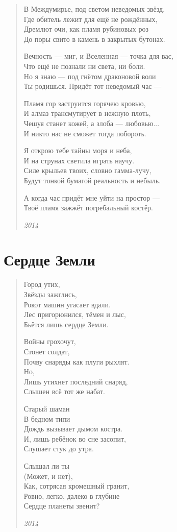 \begin{verse}
В Междумирье, под светом неведомых звёзд,\\
Где обитель лежит для ещё не рождённых,\\
Дремлют очи, как пламя рубиновых роз\\
До поры свито в камень в закрытых бутонах.

Вечность --- миг, и Вселенная --- точка для вас,\\
Что ещё не познали ни света, ни боли.\\
Но я знаю --- под гнётом драконовой воли\\
Ты родишься. Придёт тот неведомый час ---

Пламя гор заструится горячею кровью,\\
И алмаз трансмутирует в нежную плоть,\\
Чешуя станет кожей, а злоба --- любовью...\\
И никто нас не сможет тогда побороть.

Я открою тебе тайны моря и неба,\\
И на струнах светила играть научу.\\
Силе крыльев твоих, словно гамма-лучу,\\
Будут тонкой бумагой реальность и небыль.

А когда час придёт мне уйти на простор ---\\
Твоё пламя зажжёт погребальный костёр.

\emph{2014}
\end{verse}
\newpage

\section{Сердце Земли}

\begin{verse}
Город утих,\\
Звёзды зажглись,\\
Рокот машин угасает вдали.\\
Лес пригорюнился, тёмен и лыс,\\
Бьётся лишь сердце Земли.

Войны грохочут,\\
Стонет солдат,\\
Почву снаряды как плуги рыхлят.\\
Но,\\
Лишь утихнет последний снаряд,\\
Слышен всё тот же набат.

Старый шаман\\
В бедном типи\\
Дождь вызывает дымом костра.\\
И, лишь ребёнок во сне засопит,\\
Слушает стук до утра.

Слышал ли ты\\
(Может, и нет),\\
Как, сотрясая кромешный гранит,\\
Ровно, легко, далеко в глубине\\
Сердце планеты звенит?

\emph{2014}
\end{verse}
\newpage


